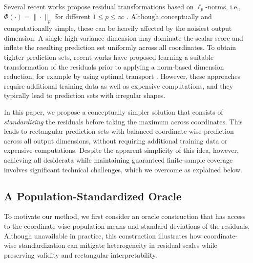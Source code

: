 {\color{brown}Several recent works propose residual transformations based on $\ell_p$-norms, i.e., $\Phi(\cdot) = \|\cdot\|_p$ for different $1\leq p \leq \infty$ \citep{johnstone2022exact}. Although conceptually and computationally simple, these can be heavily affected by the noisiest output dimension. A single high-variance dimension may dominate the scalar score and inflate the resulting prediction set uniformly across all coordinates. 
To obtain tighter prediction sets, recent works have proposed learning a suitable transformation of the residuals prior to applying a norm-based dimension reduction, for example by using optimal transport \citep{thurin2025otcp, klein2025multivariate}.
However, these approaches require additional training data as well as expensive computations, and they typically lead to prediction sets with irregular shapes.}

In this paper, we propose a conceptually simpler solution that consists of {\em standardizing} the residuals before taking the maximum across coordinates. This leads to rectangular prediction sets with balanced coordinate-wise prediction across all output dimensions, without requiring additional training data or expensive computations.
Despite the apparent simplicity of this idea, however, achieving all desiderata while maintaining guaranteed finite-sample coverage involves significant technical challenges, which we overcome as explained below.


\subsection{A Population-Standardized Oracle}
\label{sec:pop-oracle}
 
To motivate our method, we first consider an oracle construction that has access to the coordinate-wise population means and standard deviations of the residuals. 
Although unavailable in practice, this
construction illustrates how coordinate-wise standardization can mitigate heterogeneity in residual scales while preserving validity and rectangular interpretability.

